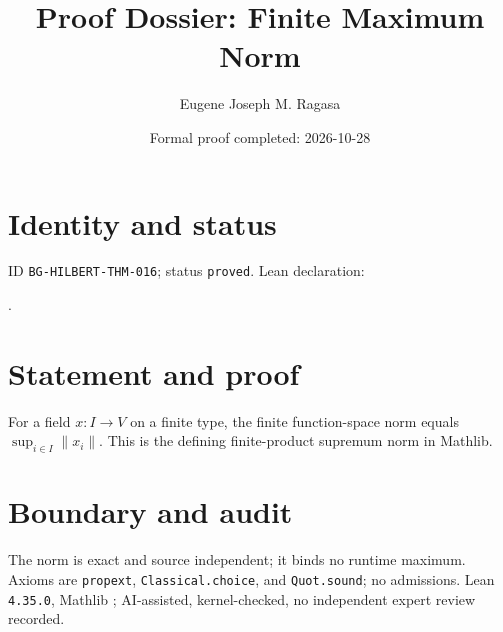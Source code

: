 \documentclass[11pt]{article}
\title{Proof Dossier: Finite Maximum Norm}\author{Eugene Joseph M. Ragasa}\date{Formal proof completed: 2026-10-28}
\begin{document}
\raggedright\maketitle
\section{Identity and status}
ID \texttt{BG-HILBERT-THM-016}; status \texttt{proved}. Lean declaration:
\par{}.
\section{Statement and proof}
For a field $x:I\to V$ on a finite type, the finite function-space norm equals $\sup_{i\in I}\lVert x_i\rVert$. This is the defining finite-product supremum norm in Mathlib.
\section{Boundary and audit}
The norm is exact and source independent; it binds no runtime maximum. Axioms are \texttt{propext}, \texttt{Classical.choice}, and \texttt{Quot.sound}; no admissions. Lean \texttt{4.35.0}, Mathlib {\scriptsize{}}; AI-assisted, kernel-checked, no independent expert review recorded.
\end{document}
